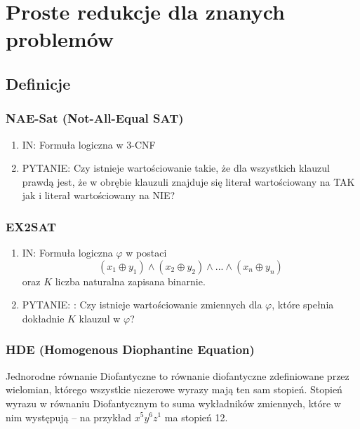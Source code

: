 \section{Proste redukcje dla znanych problemów}



\subsection{Definicje} 

\subsubsection{NAE-Sat (Not-All-Equal SAT)}

\begin{enumerate}
    \item \textsc{IN:} Formuła logiczna w 3-CNF
    \item \textsc{PYTANIE:}  Czy istnieje wartościowanie takie, że dla wszystkich klauzul prawdą jest, że w obrębie klauzuli znajduje się literał wartościowany na \textsc{TAK} jak i literał wartościowany na \textsc{NIE}? 
\end{enumerate}

\subsubsection{EX2SAT}

\begin{enumerate}
    \item IN: Formuła logiczna \(\varphi\) w postaci
    \[  (x_1 \oplus y_1 ) \land (x_2 \oplus y_2) \land ... \land (x_n \oplus y_n)
    \]
    oraz \( K \) liczba naturalna zapisana binarnie.
    \item PYTANIE: : Czy istnieje wartościowanie zmiennych dla \(\varphi\), które spełnia dokładnie
    \(K\) klauzul w \(\varphi\)?
\end{enumerate}

\subsubsection{HDE (Homogenous Diophantine Equation)}

\begin{definition}
Jednorodne równanie Diofantyczne to równanie diofantyczne zdefiniowane przez wielomian, którego wszystkie niezerowe wyrazy mają ten sam stopień. Stopień wyrazu w równaniu Diofantycznym to suma wykładników zmiennych, które w nim występują -- na przykład \( x^5y^6z^1 \) ma stopień 12.  
\end{definition}

